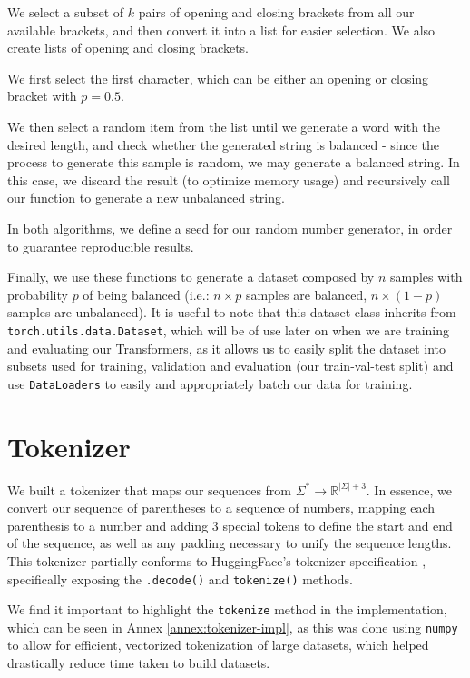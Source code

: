 We select a subset of $k$ pairs of opening and closing brackets from all our available brackets, and then convert it into a list for easier selection. We also create lists of opening and closing brackets.

We first select the first character, which can be either an opening or closing bracket with $p = 0.5$.

We then select a random item from the list until we generate a word with the desired length, and check whether the generated string is balanced - since the process to generate this sample is random, we may generate a balanced string. In this case, we discard the result (to optimize memory usage) and recursively call our function to generate a new unbalanced string.

\bigskip

In both algorithms, we define a seed for our random number generator, in order to guarantee reproducible results.

Finally, we use these functions to generate a dataset composed by $n$ samples with probability $p$ of being balanced (i.e.: $n\times p$ samples are balanced, $n \times (1-p)$ samples are unbalanced). It is useful to note that this dataset class inherits from \verb|torch.utils.data.Dataset|, which will be of use later on when we are training and evaluating our Transformers, as it allows us to easily split the dataset into subsets used for training, validation and evaluation (our train-val-test split) and use \verb|DataLoaders| to easily and appropriately batch our data for training.

\section{Tokenizer} \label{section:tokenizer}

We built a tokenizer that maps our sequences from $\Sigma^* \rightarrow \mathbb{R}^{|\Sigma|+3}$. In essence, we convert our sequence of parentheses to a sequence of numbers, mapping each parenthesis to a number and adding 3 special tokens to define the start and end of the sequence, as well as any padding necessary to unify the sequence lengths. This tokenizer partially conforms to HuggingFace's tokenizer specification \cite{hf-tokenizer}, specifically exposing the \verb|.decode()| and \verb|tokenize()| methods.

We find it important to highlight the \verb|tokenize| method in the implementation, which can be seen in Annex \ref{annex:tokenizer-impl}, as this was done using \verb|numpy| to allow for efficient, vectorized tokenization of large datasets, which helped drastically reduce time taken to build datasets.

